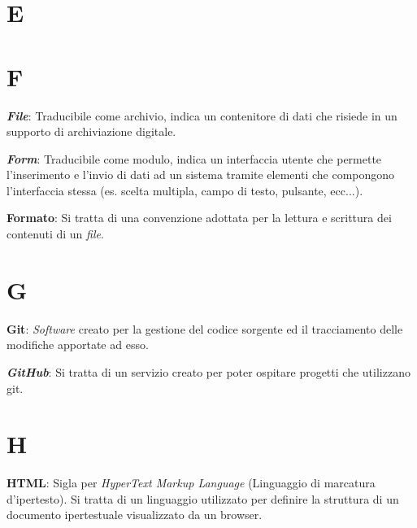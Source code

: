 \documentclass[5pt]{article}
\begin{document}
\pagebreak

\section*{E}

\pagebreak

\section*{F}
\begin{flushleft}

\textbf{\textit{File}}: Traducibile come archivio, indica un contenitore di dati che risiede in un supporto di archiviazione digitale.\newline

\textbf{\textit{Form}}: Traducibile come modulo, indica un interfaccia utente che permette l'inserimento e l'invio di dati ad un sistema tramite elementi che compongono l'interfaccia stessa (es. scelta multipla, campo di testo, pulsante, ecc...).\newline

\textbf{Formato}: Si tratta di una convenzione adottata per la lettura e scrittura dei contenuti di un \textit{file}.

\end{flushleft}

\pagebreak

\section*{G}
\begin{flushleft}

\textbf{Git}: \textit{Software} creato per la gestione del codice sorgente ed il tracciamento delle modifiche apportate ad esso.\newline

\textbf{\textit{GitHub}}: Si tratta di un servizio creato per poter ospitare progetti che utilizzano git.

\end{flushleft}

\pagebreak

\section*{H}
\begin{flushleft}

\textbf{HTML}: Sigla per \textit{HyperText Markup Language} (Linguaggio di marcatura d'ipertesto). Si tratta di un linguaggio utilizzato per definire la struttura di un documento ipertestuale visualizzato da un browser.

\end{flushleft}
\end{document}
